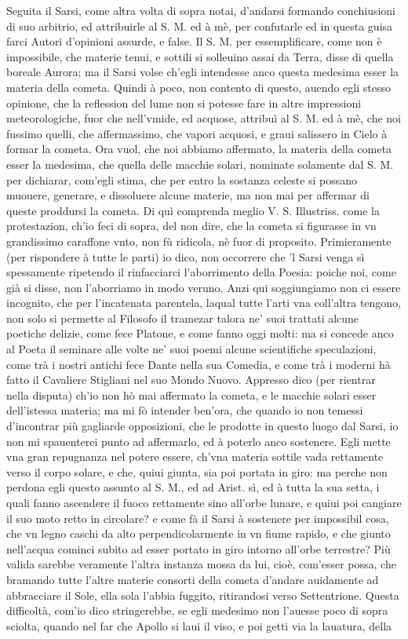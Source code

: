 \documentclass[11pt,twoside,openany]{book}
\begin{document}
Seguita il Sarsi, come altra volta di sopra notai, d'andarsi formando conchiusioni di suo arbitrio, ed attribuirle al S. M. ed à mè, per confutarle ed in questa guisa farci Autori d'opinioni assurde, e false. Il S. M. per essemplificare, come non è impossibile, che materie tenui, e sottili si solleuino assai da Terra, disse di quella boreale Aurora; ma il Sarsi volse ch'egli intendesse anco questa medesima esser la materia della cometa. Quindi à poco, non contento di questo, auendo egli stesso opinione, che la reflession del lume non si potesse fare in altre impressioni meteorologiche, fuor che nell'vmide, ed acquose, attribuì al S. M. ed à mè, che noi fussimo quelli, che affermassimo, che vapori acquosi, e graui salissero in Cielo à formar la cometa. Ora vuol, che noi abbiamo affermato, la materia della cometa esser la medesima, che quella delle macchie solari, nominate solamente dal S. M. per dichiarar, com'egli stima, che per entro la sostanza celeste si possano muouere, generare, e dissoluere alcune materie, ma non mai per affermar di queste proddursi la cometa. Di quì comprenda meglio V. S. Illustriss. come la protestazion, ch'io feci di sopra, del non dire, che la cometa si figurasse in vn grandissimo caraffone vnto, non fù ridicola, nè fuor di proposito. Primieramente (per rispondere à tutte le parti) io dico, non occorrere che 'l Sarsi venga sì spessamente ripetendo il rinfacciarci l'aborrimento della Poesia: poiche noi, come già si disse, non l'aborriamo in modo veruno. Anzi qui soggiungiamo non ci essere incognito, che per l'incatenata parentela, laqual tutte l'arti vna coll'altra tengono, non solo si permette al Filosofo il tramezar talora ne' suoi trattati alcune poetiche delizie, come fece Platone, e come fanno oggi molti: ma si concede anco al Poeta il seminare alle volte ne' suoi poemi alcune scientifiche speculazioni, come trà i nostri antichi fece Dante nella sua Comedia, e come trà i moderni hà fatto il Cavaliere Stigliani nel suo Mondo Nuovo. Appresso dico (per rientrar nella disputa) ch'io non hò mai affermato la cometa, e le macchie solari esser dell'istessa materia; ma mi fò intender ben'ora, che quando io non temessi d'incontrar più gagliarde opposizioni, che le prodotte in questo luogo dal Sarsi, io non mi spauenterei punto ad affermarlo, ed à poterlo anco sostenere. Egli mette vna gran repugnanza nel potere essere, ch'vna materia sottile vada rettamente verso il corpo solare, e che, quiui giunta, sia poi portata in giro: ma perche non perdona egli questo assunto al S. M., ed ad Arist. sì, ed à tutta la sua setta, i quali fanno ascendere il fuoco rettamente sino all'orbe lunare, e quiui poi cangiare il suo moto retto in circolare? e come fà il Sarsi à sostenere per impossibil cosa, che vn legno caschi da alto perpendicolarmente in vn fiume rapido, e che giunto nell'acqua cominci subito ad esser portato in giro intorno all'orbe terrestre? Più valida sarebbe veramente l'altra instanza mossa da lui, cioè, com'esser possa, che bramando tutte l'altre materie consorti della cometa d'andare auidamente ad abbracciare il Sole, ella sola l'abbia fuggito, ritirandosi verso Settentrione. Questa difficoltà, com'io dico stringerebbe, se egli medesimo non l'auesse poco di sopra sciolta, quando nel far che Apollo si laui il viso, e poi getti via la lauatura, della 
\end{document}

